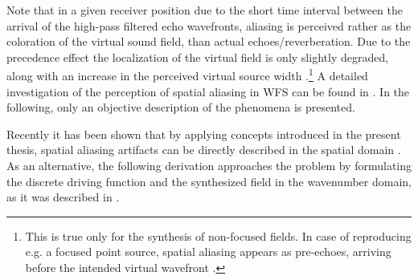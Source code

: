 Note that in a given receiver position due to the short time interval between the arrival of the high-pass filtered echo wavefronts, aliasing is perceived rather as the coloration of the virtual sound field, than actual echoes/reverberation. 
Due to the precedence effect the localization of the virtual field is only slightly degraded, along with an increase in the perceived virtual source width \cite{ahrens2017:daga}.\footnote{This is true only for the synthesis of non-focused fields.
In case of reproducing e.g. a focused point source, spatial aliasing appears as pre-echoes, arriving before the intended virtual wavefront \cite{Spors2009:FocusedSourceAliasing}.}
A detailed investigation of the perception of spatial aliasing in WFS can be found in \cite{8371275}.
In the following, only an objective description of the phenomena is presented.

Recently it has been shown that by applying concepts introduced in the present thesis, spatial aliasing artifacts can be directly described in the spatial domain \cite{Winter2018:GeometricModel, 8611109}.
As an alternative, the following derivation approaches the problem by formulating the discrete driving function and the synthesized field in the wavenumber domain, as it was described in \cite{Ahrens2012}.

